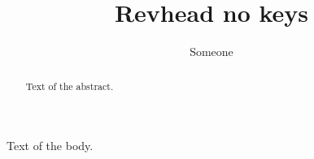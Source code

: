 \documentclass[aps,showkeys,showpacs]{revtex4-2}
\begin{document}
\title{Revhead no keys}
\author{Someone}
\begin{abstract}
Text of the abstract.
\end{abstract}
\maketitle
Text of the body.
\end{document}

